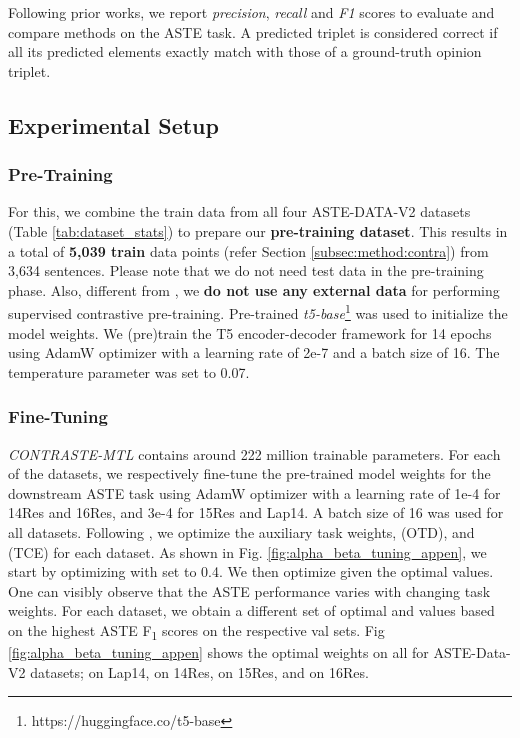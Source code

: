 Following prior works, we report \textit{precision}, \textit{recall} and \textit{F1} scores to evaluate and compare methods on the ASTE task. 
A predicted triplet is considered correct if all its predicted elements exactly match with those of a ground-truth opinion triplet.


\subsection{Experimental Setup}
\label{subsec:exp:setup}

\subsubsection{Pre-Training}
For this, we combine the train data from all four ASTE-DATA-V2 datasets (Table \ref{tab:dataset_stats}) to prepare our \textbf{pre-training dataset}.
This results in a total of \textbf{5,039 train} data points (refer Section \ref{subsec:method:contra}) from 3,634 sentences.
Please note that we do not need test data in the pre-training phase.
Also, different from \citet{li-etal-2021-learning-implicit}, we \textbf{do not use any external data} for performing supervised contrastive pre-training.
Pre-trained \textit{t5-base}\footnote{https://huggingface.co/t5-base} was used to initialize the model weights. 
We (pre)train the T5 encoder-decoder framework for 14 epochs using AdamW optimizer \cite{AdamW} with a learning rate of 2e-7 and a batch size of 16.
The temperature parameter  was set to 0.07.


\subsubsection{Fine-Tuning}
\textit{CONTRASTE-MTL} contains around 222 million trainable parameters. 
For each of the datasets, we respectively fine-tune the pre-trained model weights for the downstream ASTE task using AdamW optimizer with a learning rate of 1e-4 for 14Res and 16Res, and 3e-4 for 15Res and Lap14. 
A batch size of 16 was used for all datasets. 
Following \citet{mrini-etal-2022-detection}, we optimize the auxiliary task weights,  (OTD), and  (TCE) for each dataset.
As shown in Fig. \ref{fig:alpha_beta_tuning_appen}, we start by optimizing  with  set to 0.4.
We then optimize  given the optimal  values.
One can visibly observe that the ASTE performance varies with changing task weights.
For each dataset, we obtain a different set of optimal  and  values based on the highest ASTE F\textsubscript{1} scores on the respective val sets.
Fig \ref{fig:alpha_beta_tuning_appen} shows the optimal weights on all for ASTE-Data-V2 datasets;  on Lap14,  on 14Res,  on 15Res,  and  on 16Res.


